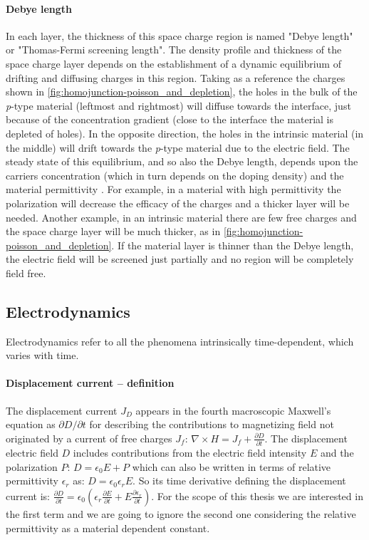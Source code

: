 		\paragraph{Debye length}\label{intro-debye_length}
		In each layer, the thickness of this space charge region is named "Debye length" or "Thomas\hyp{}Fermi screening length".
		The density profile and thickness of the space charge layer depends on the establishment of a dynamic equilibrium of drifting and diffusing charges in this region.
		Taking as a reference the charges shown in \cref{fig:homojunction-poisson_and_depletion}, the holes in the bulk of the \textit{p}-type material (leftmost and rightmost) will diffuse towards the interface, just because of the concentration gradient (close to the interface the material is depleted of holes).
		In the opposite direction, the holes in the intrinsic material (in the middle) will drift towards the \textit{p}-type material due to the electric field.
		The steady state of this equilibrium, and so also the Debye length, depends upon the carriers concentration (which in turn depends on the doping density) and the material permittivity \cite{WikipediaDebye2019}.
		For example, in a material with high permittivity the polarization will decrease the efficacy of the charges and a thicker layer will be needed.
		Another example, in an intrinsic material there are few free charges and the space charge layer will be much thicker, as in \cref{fig:homojunction-poisson_and_depletion}.
		If the material layer is thinner than the Debye length, the electric field will be screened just partially and no region will be completely field free.

	\subsection{Electrodynamics}
		Electrodynamics refer to all the phenomena intrinsically time-dependent, which varies with time.

		\paragraph{Displacement current -- definition}\label{intro_displacement_current}
		The displacement current $J_D$ appears in the fourth macroscopic Maxwell's equation as $\partial D / \partial t$ for describing the contributions to magnetizing field not originated by a current of free charges $J_f$: $\nabla \times H = J_f + \frac{\partial D}{\partial t}$.
		The displacement electric field $D$ includes contributions from the electric field intensity $E$ and the polarization $P$: $D=\epsilon_0 E + P$ which can also be written in terms of relative permittivity $\epsilon_r$ as: $D= \epsilon_0 \epsilon_r E$.
		So its time derivative defining the displacement current is: $\frac{\partial D}{\partial t} = \epsilon_0 (\epsilon_r\frac{\partial E}{\partial t} + E\frac{\partial \epsilon_r}{\partial t})$.
		For the scope of this thesis we are interested in the first term and we are going to ignore the second one considering the relative permittivity as a material dependent constant.


